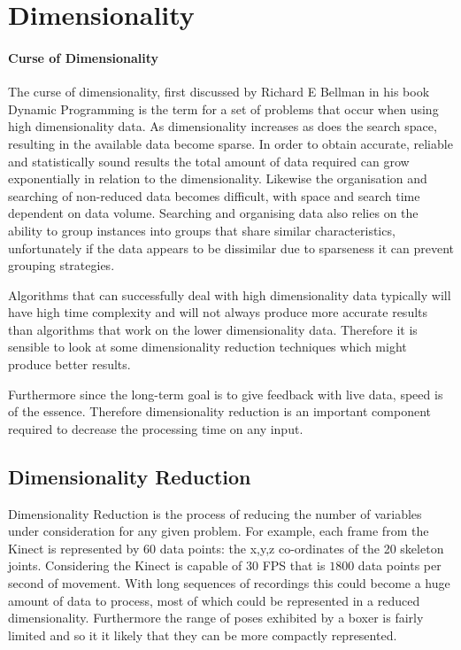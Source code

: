 \section{Dimensionality}
\paragraph{Curse of Dimensionality}
The curse of dimensionality, first discussed by Richard E Bellman in his book Dynamic Programming\cite{dynprog} is the term for a set of problems that occur when using high dimensionality data. As dimensionality increases as does the search space, resulting in the available data become sparse. In order to obtain accurate, reliable and statistically sound results the total amount of data required can grow exponentially in relation to the dimensionality. Likewise the organisation and searching of non-reduced data becomes difficult, with space and search time dependent on data volume. Searching and organising data also relies on the ability to group instances into groups that share similar characteristics, unfortunately if the data appears to be dissimilar due to sparseness it can prevent grouping strategies.

Algorithms that can successfully deal with high dimensionality data typically will have high time complexity and will not always produce more accurate results than algorithms that work on the lower dimensionality data. Therefore it is sensible to look at some dimensionality reduction techniques which might produce better results.

Furthermore since the long-term goal is to give feedback with live data, speed is of the essence. Therefore dimensionality reduction is an important component required to decrease the processing time on any input.

\subsection{Dimensionality Reduction}
Dimensionality Reduction is the process of reducing the number of variables under consideration for any given problem. For example, each frame from the Kinect is represented by 60 data points: the x,y,z co-ordinates of the 20 skeleton joints. Considering the Kinect is capable of 30 FPS that is $1800$ data points per second of movement. With long sequences of recordings this could become a huge amount of data to process, most of which could be represented in a reduced dimensionality.
Furthermore the range of poses exhibited by a boxer is fairly limited and so it it likely that they can be more compactly represented.



